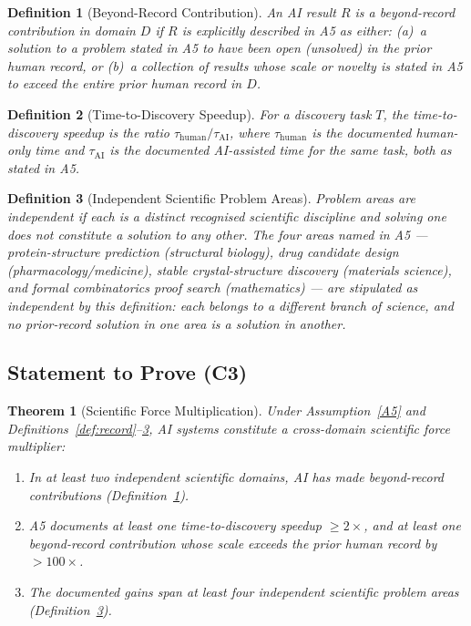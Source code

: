 \documentclass[12pt]{article}
\newtheorem{theorem}{Theorem}
\newtheorem{definition}{Definition}
\begin{document}
\begin{definition}[Beyond-Record Contribution]\label{def:beyond}
  An AI result $R$ is a \emph{beyond-record contribution} in domain $D$
  if $R$ is explicitly described in A5 as either:
  (a)~a solution to a problem stated in A5 to have been \emph{open}
  (unsolved) in the prior human record, or
  (b)~a collection of results whose scale or novelty is stated in A5
  to exceed the entire prior human record in $D$.
\end{definition}

\begin{definition}[Time-to-Discovery Speedup]\label{def:speedup}
  For a discovery task $T$, the \emph{time-to-discovery speedup} is the
  ratio $\tau_{\mathrm{human}} / \tau_{\mathrm{AI}}$, where
  $\tau_{\mathrm{human}}$ is the documented human-only time and
  $\tau_{\mathrm{AI}}$ is the documented AI-assisted time for the same task,
  both as stated in A5.
\end{definition}

\begin{definition}[Independent Scientific Problem Areas]\label{def:independent}
  Problem areas are \emph{independent} if each is a distinct recognised
  scientific discipline and solving one does not constitute a solution to
  any other.  The four areas named in A5 --- protein-structure prediction
  (structural biology), drug candidate design (pharmacology/medicine),
  stable crystal-structure discovery (materials science), and formal
  combinatorics proof search (mathematics) --- are stipulated as
  independent by this definition: each belongs to a different branch of
  science, and no prior-record solution in one area is a solution in
  another.
\end{definition}

\subsection*{Statement to Prove (C3)}

\begin{theorem}[Scientific Force Multiplication]\label{thm:C3}
  Under Assumption~\ref{A5} and Definitions~\ref{def:record}--\ref{def:independent},
  AI systems constitute a cross-domain scientific force multiplier:
  \begin{enumerate}
    \item[(i)] In at least two independent scientific domains, AI has made
      beyond-record contributions (Definition~\ref{def:beyond}).
    \item[(ii)] A5 documents at least one time-to-discovery speedup
      $\geq 2\times$, and at least one beyond-record contribution whose
      scale exceeds the prior human record by $>100\times$.
    \item[(iii)] The documented gains span at least four independent
      scientific problem areas (Definition~\ref{def:independent}).
  \end{enumerate}
\end{theorem}
\end{document}
